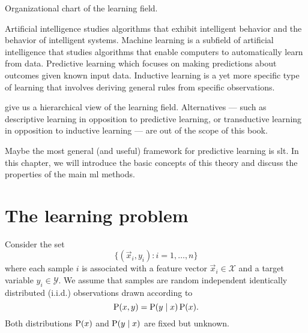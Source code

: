 \begin{figurebox}[label=fig:learning]{Organizational chart of the learning field.}
  \centering
  \tcblower
  Artificial intelligence studies algorithms that exhibit intelligent behavior and the
  behavior of intelligent systems.  Machine learning is a subfield of artificial
  intelligence that studies algorithms that enable computers to automatically learn from
  data.  Predictive learning which focuses on making predictions about outcomes given
  known input data.  Inductive learning is a yet more specific type of learning that
  involves deriving general rules from specific observations.
\end{figurebox}

 give us a hierarchical view of the learning field.  Alternatives ---
such as descriptive learning in opposition to predictive learning, or transductive
learning in opposition to inductive learning --- are out of the scope of this book.

Maybe the most general (and useful) framework for predictive learning is \gls{slt}.
In this chapter, we will introduce the basic concepts of this theory and discuss the
properties of the main \gls{ml} methods.

\section{The learning problem}

Consider the set
\begin{equation}
  \label{eq:training-set}
  \big\{(\vec{x}_i, y_i) : i = 1, \dots, n \big\}
\end{equation}
where each sample $i$ is associated with a feature vector $\vec{x}_i \in \mathcal{X}$ and a target variable
$y_i \in \mathcal{Y}$.  We assume that samples are random independent identically
distributed (i.i.d.) observations drawn according to $$\operatorname{P}(x, y) = \operatorname{P}(y \mid x) \operatorname{P}(x)\text{.}$$
Both distributions $\operatorname{P}(x)$ and $\operatorname{P}(y \mid x)$ are fixed but unknown.

